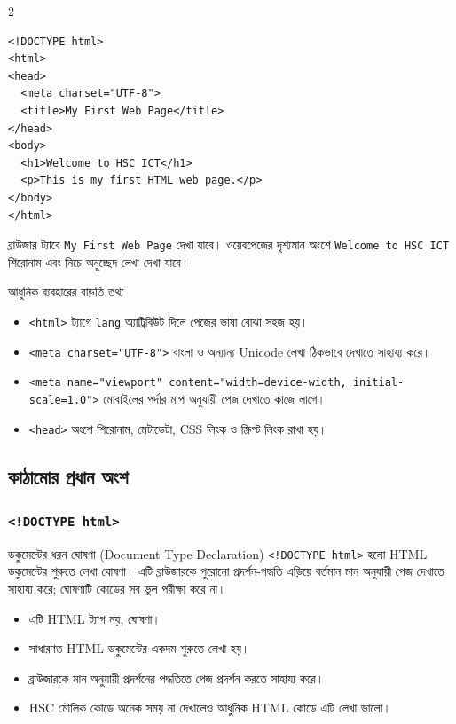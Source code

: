 \par{}\par
\begin{multicols}{2}
\begin{verbatim}
<!DOCTYPE html>
<html>
<head>
  <meta charset="UTF-8">
  <title>My First Web Page</title>
</head>
<body>
  <h1>Welcome to HSC ICT</h1>
  <p>This is my first HTML web page.</p>
</body>
</html>
\end{verbatim}
\end{multicols}
ব্রাউজার ট্যাবে \texttt{My First Web Page} দেখা যাবে। ওয়েবপেজের দৃশ্যমান অংশে \texttt{Welcome to HSC ICT} শিরোনাম এবং নিচে অনুচ্ছেদ লেখা দেখা যাবে।



\begin{keypointbox}{আধুনিক ব্যবহারের বাড়তি তথ্য}
\begin{itemize}
\item \texttt{<html>} ট্যাগে \texttt{lang} অ্যাট্রিবিউট দিলে পেজের ভাষা বোঝা সহজ হয়।
\item \texttt{<meta charset="UTF-8">} বাংলা ও অন্যান্য Unicode লেখা ঠিকভাবে দেখাতে সাহায্য করে।
\item \texttt{<meta name="viewport" content="width=device-width, initial-scale=1.0">} মোবাইলের পর্দার মাপ অনুযায়ী পেজ দেখাতে কাজে লাগে।
\item \texttt{<head>} অংশে শিরোনাম, মেটাডেটা, CSS লিংক ও স্ক্রিপ্ট লিংক রাখা হয়।
\end{itemize}
\end{keypointbox}

\subsection{কাঠামোর প্রধান অংশ}

\subsubsection{\texttt{<!DOCTYPE html>}}

\begin{definitionbox}{ডকুমেন্টের ধরন ঘোষণা (Document Type Declaration)}
\texttt{<!DOCTYPE html>} হলো HTML ডকুমেন্টের শুরুতে লেখা ঘোষণা। এটি ব্রাউজারকে পুরোনো প্রদর্শন-পদ্ধতি এড়িয়ে বর্তমান মান অনুযায়ী পেজ দেখাতে সাহায্য করে; ঘোষণাটি কোডের সব ভুল পরীক্ষা করে না।
\end{definitionbox}

\begin{itemize}
\item এটি HTML ট্যাগ নয়, ঘোষণা।
\item সাধারণত HTML ডকুমেন্টের একদম শুরুতে লেখা হয়।
\item ব্রাউজারকে মান অনুযায়ী প্রদর্শনের পদ্ধতিতে পেজ প্রদর্শন করতে সাহায্য করে।
\item HSC মৌলিক কোডে অনেক সময় না দেখালেও আধুনিক HTML কোডে এটি লেখা ভালো।
\end{itemize}

